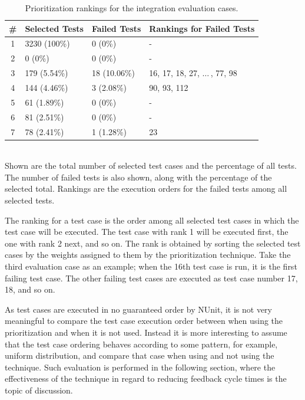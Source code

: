 \documentclass[a4paper,english,12pt]{report}
\begin{document}
\begin{table}[tbp]
  \centering
  \begin{tabular}{|c|l|l|l|}
    \hline
    \textbf{\#} & \textbf{Selected Tests} & \textbf{Failed Tests} & \textbf{Rankings for Failed Tests}\\
    \hline
    1 & 3230 (100\%) & 0 (0\%)& -\\
    \hline
    2 & 0 (0\%) & 0 (0\%)& -\\
    \hline
    3 & 179 (5.54\%) & 18 (10.06\%) & 16, 17, 18, 27, $\ldots$\,, 77, 98 \\
    \hline
    4 & 144 (4.46\%) & 3 (2.08\%) & 90, 93, 112\\
    \hline
    5 & 61 (1.89\%) & 0 (0\%)& -\\
    \hline
    6 & 81 (2.51\%) & 0 (0\%)& -\\
    \hline
    7 & 78 (2.41\%) & 1 (1.28\%)& 23\\
    \hline
  \end{tabular}
  {\\[2ex]\footnotesize Shown are the total number of selected test cases and the percentage of all tests. The number of failed tests is also shown, along with the percentage of the selected total. Rankings are the execution orders for the failed tests among all selected tests.}
  \caption{Prioritization rankings for the integration evaluation cases.}
  \label{tab:integration-evaluation-cases-prioritization}
\end{table}

The ranking for a test case is the order among all selected test cases in which the test case will be executed. The test case with rank 1 will be executed first, the one with rank 2 next, and so on. The rank is obtained by sorting the selected test cases by the weights assigned to them by the prioritization technique. Take the third evaluation case as an example; when the 16th test case is run, it is the first failing test case. The other failing test cases are executed as test case number 17, 18, and so on.

As test cases are executed in no guaranteed order by NUnit, it is not very meaningful to compare the test case execution order between when using the prioritization and when it is not used. Instead it is more interesting to assume that the test case ordering behaves according to some pattern, for example, uniform distribution, and compare that case when using and not using the technique. Such evaluation is performed in the following section, where the effectiveness of the technique in regard to reducing feedback cycle times is the topic of discussion.
\end{document}
